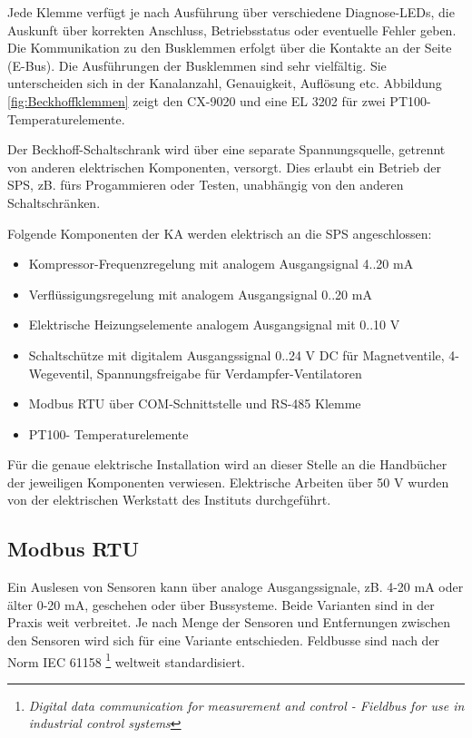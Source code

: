Jede Klemme verfügt je nach Ausführung über verschiedene Diagnose-LEDs, die Auskunft über korrekten Anschluss, Betriebsstatus oder eventuelle Fehler geben. Die Kommunikation zu den Busklemmen erfolgt über die Kontakte an der Seite (E-Bus). Die Ausführungen der Busklemmen sind sehr vielfältig. Sie unterscheiden sich in der Kanalanzahl, Genauigkeit, Auflösung etc. Abbildung \ref{fig:Beckhoffklemmen} zeigt den CX-9020 und eine EL 3202 für zwei PT100-Temperaturelemente. 

Der Beckhoff-Schaltschrank wird über eine separate Spannungsquelle, getrennt von anderen elektrischen Komponenten,  versorgt. Dies erlaubt ein Betrieb der SPS, zB. fürs Progammieren oder Testen, unabhängig von den anderen Schaltschränken. 

Folgende Komponenten der KA werden elektrisch an die SPS angeschlossen: 
\begin{itemize}
\item	Kompressor-Frequenzregelung mit analogem Ausgangsignal 4..20 mA
\item	Verflüssigungsregelung mit analogem Ausgangsignal  0..20 mA
\item	Elektrische Heizungselemente analogem Ausgangsignal mit 0..10 V
\item	Schaltschütze mit digitalem Ausgangssignal 0..24 V DC für Magnetventile, 4-Wegeventil, Spannungsfreigabe für Verdampfer-Ventilatoren
\item 	Modbus RTU über COM-Schnittstelle und RS-485 Klemme
\item 	PT100- Temperaturelemente 
\end{itemize}

Für die genaue elektrische Installation wird an dieser Stelle an die Handbücher der jeweiligen Komponenten verwiesen. Elektrische Arbeiten über 50 V wurden von der elektrischen Werkstatt des Instituts durchgeführt. \citep{MicroNovaAG2011}

\newpage
\subsection{Modbus RTU}
\label{subsec:Modbus}

Ein Auslesen von Sensoren kann über analoge Ausgangssignale, zB. 4-20 mA oder älter 0-20 mA, geschehen oder über Bussysteme. Beide Varianten sind in der Praxis weit verbreitet. Je nach Menge der Sensoren und Entfernungen zwischen den Sensoren wird sich für eine Variante entschieden. Feldbusse sind nach der Norm IEC 61158 \footnote{\textit{Digital data communication for measurement and control - Fieldbus for use in industrial control systems}} weltweit standardisiert. 

